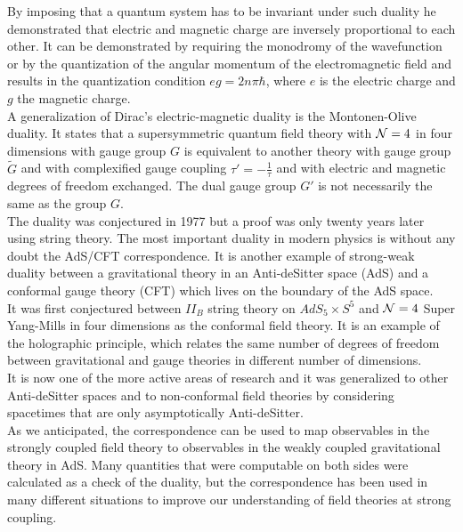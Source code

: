 By imposing that a quantum system has to be invariant under such duality he demonstrated that electric and magnetic charge are inversely proportional to each other. 
It can be demonstrated by requiring the monodromy of the wavefunction or by the quantization of the angular momentum of the electromagnetic field and results in the quantization condition $e g =  2 n \pi \hbar$, where $e$ is the electric charge and $g$ the magnetic charge.\\
A generalization of Dirac's electric-magnetic duality is the Montonen-Olive duality.
It states that a supersymmetric quantum field theory with $\mathcal{N}=4$ in four dimensions with gauge group $G$ is equivalent to another theory with gauge group $\tilde{G}$ and with complexified gauge coupling $\tau' = - \frac{1}{\tau}$ and with electric and magnetic degrees of freedom exchanged.
The dual gauge group $G'$ is not necessarily the same as the group $G$.\\
The duality was conjectured in 1977 but a proof was only twenty years later using string theory.
The most important duality in modern physics is without any doubt the AdS/CFT correspondence. 
It is another example of strong-weak duality between a gravitational theory in an Anti-deSitter space (AdS) and a conformal gauge theory (CFT) which lives on the boundary of the AdS space. \\
It was first conjectured between $II_B$ string theory on $AdS_5 \times S^5$ and $\mathcal{N}=4$ Super Yang-Mills in four dimensions as the conformal field theory. 
It is an example of the holographic principle, which relates the same number of degrees of freedom between gravitational and gauge theories in different number of dimensions.\\
It is now one of the more active areas of research and it was generalized to other Anti-deSitter spaces and to non-conformal field theories by considering spacetimes that are only asymptotically Anti-deSitter.\\
As we anticipated, the correspondence can be used to map observables in the strongly coupled field theory to observables in the weakly coupled gravitational theory in AdS.
Many quantities that were computable on both sides were calculated as a check of the duality, but the correspondence has been used in many different situations to improve our understanding of field theories at strong coupling.\\ 






